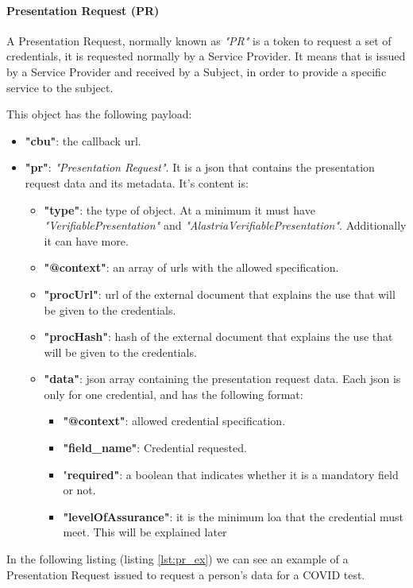 \documentclass[a4paper, 12pt]{article} %
\begin{document}
            \paragraph{Presentation Request (PR)}
                A Presentation Request, normally known as \textit{"PR"} is a token to request a set of credentials, it is requested normally by a Service Provider. It means that is issued by a Service Provider and received by a Subject, in order to provide a specific service to the subject.
                
                This object has the following payload:
                \begin{itemize}
                    \item \textbf{"cbu"}: the callback \acrshort{url}.
                    \item \textbf{"pr"}: \textit{"Presentation Request"}. It is a \acrshort{json} that contains the presentation request data and its metadata. It's content is:
                    \begin{itemize}
                        \item \textbf{"type"}: the type of object. At a minimum it must have \textit{"VerifiablePresentation"} and \textit{"AlastriaVerifiablePresentation"}. Additionally it can have more.
                        \item \textbf{"@context"}: an array of \acrshort{url}s with the allowed specification.
                        \item \textbf{"procUrl"}: \acrshort{url} of the external document that explains the use that will be given to the credentials.
                        \item \textbf{"procHash"}: hash of the external document that explains the use that will be given to the credentials.
                        \item \textbf{"data"}: \acrshort{json} array containing the presentation request data. Each \acrshort{json} is only for one credential, and has the following format:
                        \begin{itemize}
                            \item \textbf{"@context"}: allowed credential specification.
                            \item \textbf{"field\_name"}: Credential requested.
                            \item "\textbf{required"}: a boolean that indicates whether it is a mandatory field or not.
                            \item \textbf{"levelOfAssurance"}: it is the minimum \acrfull{loa} that the credential must meet. This will be explained later
                        \end{itemize}
                    \end{itemize}
                \end{itemize}
                In the following listing (listing \ref{lst:pr_ex}) we can see an example of a Presentation Request issued to request a person's data for a COVID test.
                
                
\end{document}
